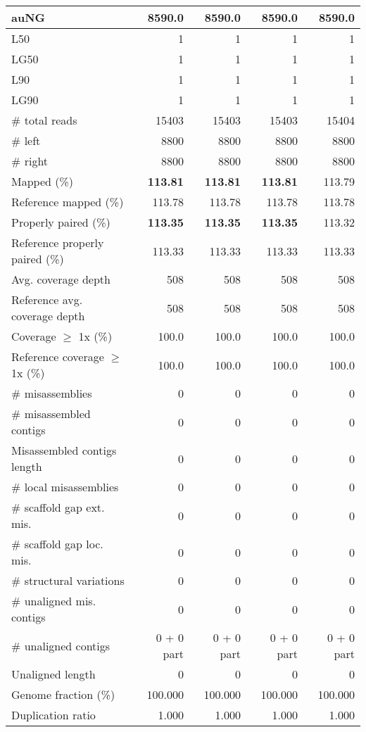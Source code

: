 \documentclass[12pt,a4paper]{article}
\begin{document}
\begin{table}[ht]
\begin{center}
\begin{tabular}{|l*{4}{|r}|}
auNG & 8590.0 & 8590.0 & 8590.0 & 8590.0 \\ \hline
L50 & 1 & 1 & 1 & 1 \\ \hline
LG50 & 1 & 1 & 1 & 1 \\ \hline
L90 & 1 & 1 & 1 & 1 \\ \hline
LG90 & 1 & 1 & 1 & 1 \\ \hline
\# total reads & 15403 & 15403 & 15403 & 15404 \\ \hline
\# left & 8800 & 8800 & 8800 & 8800 \\ \hline
\# right & 8800 & 8800 & 8800 & 8800 \\ \hline
Mapped (\%) & {\bf 113.81} & {\bf 113.81} & {\bf 113.81} & 113.79 \\ \hline
Reference mapped (\%) & 113.78 & 113.78 & 113.78 & 113.78 \\ \hline
Properly paired (\%) & {\bf 113.35} & {\bf 113.35} & {\bf 113.35} & 113.32 \\ \hline
Reference properly paired (\%) & 113.33 & 113.33 & 113.33 & 113.33 \\ \hline
Avg. coverage depth & 508 & 508 & 508 & 508 \\ \hline
Reference avg. coverage depth & 508 & 508 & 508 & 508 \\ \hline
Coverage $\geq$ 1x (\%) & 100.0 & 100.0 & 100.0 & 100.0 \\ \hline
Reference coverage $\geq$ 1x (\%) & 100.0 & 100.0 & 100.0 & 100.0 \\ \hline
\# misassemblies & 0 & 0 & 0 & 0 \\ \hline
\# misassembled contigs & 0 & 0 & 0 & 0 \\ \hline
Misassembled contigs length & 0 & 0 & 0 & 0 \\ \hline
\# local misassemblies & 0 & 0 & 0 & 0 \\ \hline
\# scaffold gap ext. mis. & 0 & 0 & 0 & 0 \\ \hline
\# scaffold gap loc. mis. & 0 & 0 & 0 & 0 \\ \hline
\# structural variations & 0 & 0 & 0 & 0 \\ \hline
\# unaligned mis. contigs & 0 & 0 & 0 & 0 \\ \hline
\# unaligned contigs & 0 + 0 part & 0 + 0 part & 0 + 0 part & 0 + 0 part \\ \hline
Unaligned length & 0 & 0 & 0 & 0 \\ \hline
Genome fraction (\%) & 100.000 & 100.000 & 100.000 & 100.000 \\ \hline
Duplication ratio & 1.000 & 1.000 & 1.000 & 1.000 \\ \hline

\end{tabular}
\end{center}
\end{table}
\end{document}
